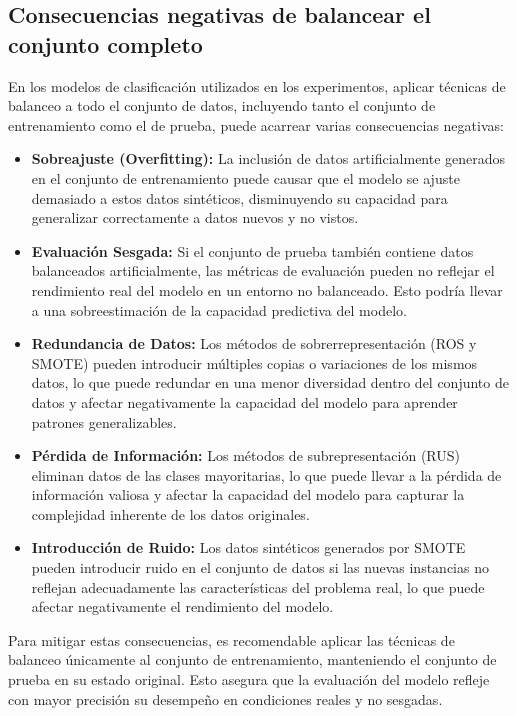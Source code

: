 \subsection{Consecuencias negativas de balancear el conjunto completo}

En los modelos de clasificación utilizados en los experimentos, aplicar técnicas de balanceo a todo el conjunto de datos, incluyendo tanto el conjunto de entrenamiento como el de prueba, puede acarrear varias consecuencias negativas:

\begin{itemize}
    \item \textbf{Sobreajuste (Overfitting):} La inclusión de datos artificialmente generados en el conjunto de entrenamiento puede causar que el modelo se ajuste demasiado a estos datos sintéticos, disminuyendo su capacidad para generalizar correctamente a datos nuevos y no vistos.
    \item \textbf{Evaluación Sesgada:} Si el conjunto de prueba también contiene datos balanceados artificialmente, las métricas de evaluación pueden no reflejar el rendimiento real del modelo en un entorno no balanceado. Esto podría llevar a una sobreestimación de la capacidad predictiva del modelo.
    \item \textbf{Redundancia de Datos:} Los métodos de sobrerrepresentación (ROS y SMOTE) pueden introducir múltiples copias o variaciones de los mismos datos, lo que puede redundar en una menor diversidad dentro del conjunto de datos y afectar negativamente la capacidad del modelo para aprender patrones generalizables.
    \item \textbf{Pérdida de Información:} Los métodos de subrepresentación (RUS) eliminan datos de las clases mayoritarias, lo que puede llevar a la pérdida de información valiosa y afectar la capacidad del modelo para capturar la complejidad inherente de los datos originales.
    \item \textbf{Introducción de Ruido:} Los datos sintéticos generados por SMOTE pueden introducir ruido en el conjunto de datos si las nuevas instancias no reflejan adecuadamente las características del problema real, lo que puede afectar negativamente el rendimiento del modelo.
\end{itemize}

Para mitigar estas consecuencias, es recomendable aplicar las técnicas de balanceo únicamente al conjunto de entrenamiento, manteniendo el conjunto de prueba en su estado original. Esto asegura que la evaluación del modelo refleje con mayor precisión su desempeño en condiciones reales y no sesgadas.


